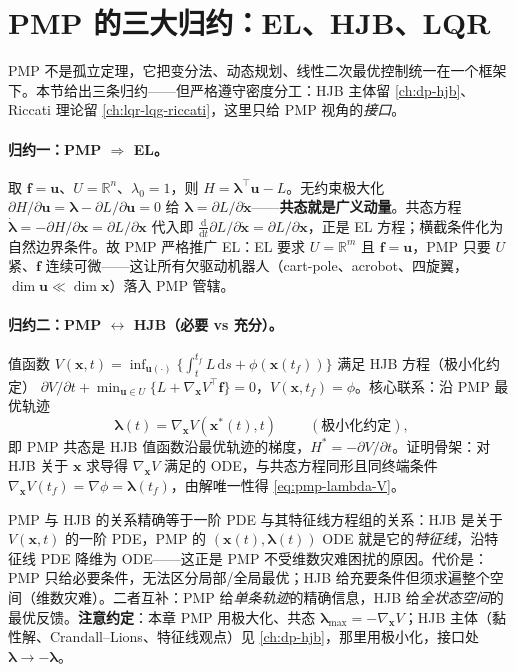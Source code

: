 \section{PMP 的三大归约：EL、HJB、LQR}
\label{sec:pmp-reductions}

PMP 不是孤立定理，它把变分法、动态规划、线性二次最优控制统一在一个框架下。本节给出三条归约——但严格遵守密度分工：HJB 主体留 \cref{ch:dp-hjb}、Riccati 理论留 \cref{ch:lqr-lqg-riccati}，这里只给 PMP 视角的\emph{接口}。

\paragraph{归约一：PMP $\Rightarrow$ EL。}
取 $\mathbf f=\mathbf u$、$U=\mathbb R^n$、$\lambda_0=1$，则 $H=\boldsymbol\lambda^\top\mathbf u-L$。无约束极大化 $\partial H/\partial\mathbf u=\boldsymbol\lambda-\partial L/\partial\mathbf u=0$ 给 $\boldsymbol\lambda=\partial L/\partial\dot{\mathbf x}$——\textbf{共态就是广义动量}。共态方程 $\dot{\boldsymbol\lambda}=-\partial H/\partial\mathbf x=\partial L/\partial\mathbf x$ 代入即 $\tfrac{\mathrm d}{\mathrm dt}\partial L/\partial\dot{\mathbf x}=\partial L/\partial\mathbf x$，正是 EL 方程；横截条件化为自然边界条件。故 PMP 严格推广 EL：EL 要求 $U=\mathbb R^m$ 且 $\mathbf f=\mathbf u$，PMP 只要 $U$ 紧、$\mathbf f$ 连续可微——这让所有欠驱动机器人（cart-pole、acrobot、四旋翼，$\dim\mathbf u\ll\dim\mathbf x$）落入 PMP 管辖。

\paragraph{归约二：PMP $\leftrightarrow$ HJB（必要 vs 充分）。}
值函数 $V(\mathbf x,t)=\inf_{\mathbf u(\cdot)}\{\int_t^{t_f}L\,\mathrm ds+\phi(\mathbf x(t_f))\}$ 满足 HJB 方程（极小化约定）
$\partial V/\partial t+\min_{\mathbf u\in U}\{L+\nabla_{\mathbf x}V^\top\mathbf f\}=0$，$V(\mathbf x,t_f)=\phi$。核心联系：沿 PMP 最优轨迹
\begin{equation}
  \boxed{\;\boldsymbol\lambda(t)=\nabla_{\mathbf x}V(\mathbf x^\ast(t),t)\;}\qquad(\text{极小化约定}),
  \label{eq:pmp-lambda-V}
\end{equation}
即 PMP 共态是 HJB 值函数沿最优轨迹的梯度，$H^\ast=-\partial V/\partial t$。证明骨架：对 HJB 关于 $\mathbf x$ 求导得 $\nabla_{\mathbf x}V$ 满足的 ODE，与共态方程同形且同终端条件 $\nabla_{\mathbf x}V(t_f)=\nabla\phi=\boldsymbol\lambda(t_f)$，由解唯一性得 \cref{eq:pmp-lambda-V}。

\begin{insight}
PMP 与 HJB 的关系精确等于一阶 PDE 与其特征线方程组的关系：HJB 是关于 $V(\mathbf x,t)$ 的一阶 PDE，PMP 的 $(\mathbf x(t),\boldsymbol\lambda(t))$ ODE 就是它的\emph{特征线}，沿特征线 PDE 降维为 ODE——这正是 PMP 不受维数灾难困扰的原因。代价是：PMP 只给必要条件，无法区分局部/全局最优；HJB 给充要条件但须求遍整个空间（维数灾难）。二者互补：PMP 给\emph{单条轨迹}的精确信息，HJB 给\emph{全状态空间}的最优反馈。\textbf{注意约定}：本章 PMP 用极大化、共态 $\boldsymbol\lambda_{\max}=-\nabla_{\mathbf x}V$；HJB 主体（黏性解、Crandall--Lions、特征线观点）见 \cref{ch:dp-hjb}，那里用极小化，接口处 $\boldsymbol\lambda\to-\boldsymbol\lambda$。
\end{insight}

